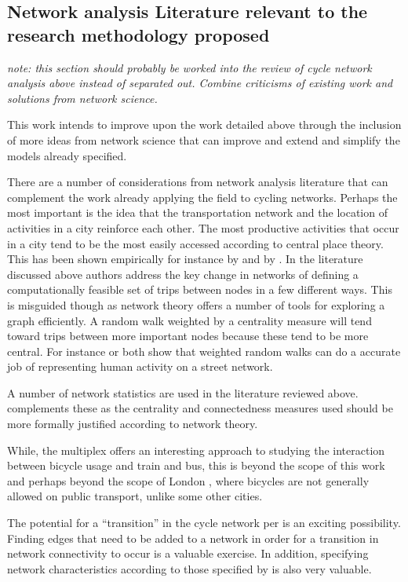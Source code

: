 \documentclass[11pt]{article} %
\begin{document}
\subsection{Network analysis Literature relevant to the research methodology proposed}

\textit{note: this section should probably be worked into the review of cycle network analysis above instead of separated out. Combine criticisms of existing work and solutions from network science.}

This work intends to improve upon the work detailed above through the inclusion of more ideas from network science that can improve and extend and simplify the models already specified. 

There are a number of considerations from network analysis literature that can complement the work already applying the field to cycling networks. Perhaps the most important is the idea that the transportation network and the location of activities in a city reinforce each other. The most productive activities that occur in a city tend to be the most easily accessed according to central place theory. This has been shown empirically for instance by \cite{porta2012street} and by \cite{wang2011street}. In the literature discussed above authors address the key change in networks of defining a computationally feasible set of trips between nodes in a few different ways. This is misguided though as network theory offers a number of tools for exploring a graph efficiently. A random walk weighted by a centrality measure will tend toward trips between more important nodes because these tend to be more central. For instance \cite{Jiang2009characterizing} or  \cite{volchenkov2007random} both show that weighted random walks can do a accurate job of representing human activity on a street network. 

A number of network statistics are used in the literature reviewed above. \cite{crucitti2006centrality} complements these as the centrality and connectedness measures used should be more formally justified according to network theory. 

While, the multiplex offers an interesting approach to studying the interaction between bicycle usage and train and bus, this is beyond the scope of this work and perhaps beyond the scope of London , where bicycles are not generally allowed on public transport, unlike some other cities. 

The potential for a ``transition'' in the cycle network per \cite{barthelemy2018transitions} is an exciting possibility. Finding edges that need to be added to a network in order for a transition in network connectivity to occur is a valuable exercise. In addition, specifying network characteristics according to those specified by \cite{barthelemy2011spatial} is also very valuable. 
\end{document}
